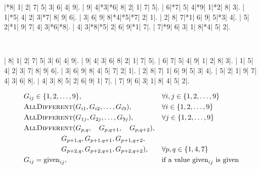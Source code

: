 \documentclass{cons-beamer}
\begin{document}
\begin{frame}[fragile]
  \begin{center}
    \vspace{2mm}
    \PuzzleUnitlength=11pt
    \renewcommand*\SudokuLinethickness{1pt}
    \renewcommand*\PuzzleFont{\sf\tiny}
    \begin{Sudoku}
      |*8| 1| 2| 7| 5| 3| 6| 4| 9|.
      | 9| 4|*3|*6| 8| 2| 1| 7| 5|.
      | 6|*7| 5| 4|*9| 1|*2| 8| 3|.
      | 1|*5| 4| 2| 3|*7| 8| 9| 6|.
      | 3| 6| 9| 8|*4|*5|*7| 2| 1|.
      | 2| 8| 7|*1| 6| 9| 5|*3| 4|.
      | 5| 2|*1| 9| 7| 4| 3|*6|*8|.
      | 4| 3|*8|*5| 2| 6| 9|*1| 7|.
      | 7|*9| 6| 3| 1| 8|*4| 5| 2|.
    \end{Sudoku}
    ~~~~~
    \PuzzleSolution
    \begin{Sudoku}
      | 8| 1| 2| 7| 5| 3| 6| 4| 9|.
      | 9| 4| 3| 6| 8| 2| 1| 7| 5|.
      | 6| 7| 5| 4| 9| 1| 2| 8| 3|.
      | 1| 5| 4| 2| 3| 7| 8| 9| 6|.
      | 3| 6| 9| 8| 4| 5| 7| 2| 1|.
      | 2| 8| 7| 1| 6| 9| 5| 3| 4|.
      | 5| 2| 1| 9| 7| 4| 3| 6| 8|.
      | 4| 3| 8| 5| 2| 6| 9| 1| 7|.
      | 7| 9| 6| 3| 1| 8| 4| 5| 2|.
    \end{Sudoku}
  \end{center}
  \begin{example}
    \footnotesize
    \vspace{-1em}
    \begin{align}
      &G_{ij} \in \{1, 2, \dots, 9\}, \quad &&\forall i, j \in \{1, 2, \dots, 9\} \\ %
      &\cons{AllDifferent}{G_{i1}, G_{i2}, \dots, G_{i9}}, \quad &&\forall i \in \{1, 2, \dots, 9\} \\ %
      &\cons{AllDifferent}{G_{1j}, G_{2j}, \dots, G_{9j}}, \quad &&\forall j \in \{1, 2, \dots, 9\} \\ 
      &\cons{AllDifferent}{G_{p, q}, ~~~G_{p, q+1}, ~~~G_{p, q+2}}, && \notag \\
      &\qquad \quad \quad \quad ~G_{p+1, q}, G_{p+1, q+1}, G_{p+1, q+2}, && \notag \\
      &\qquad \quad \quad \quad ~G_{p+2, q}, G_{p+2, q+1}, G_{p+2, q+2}), \quad &&\forall p, q \in \{1, 4, 7\} \\ 
      &G_{ij} = \mbox{given}_{ij}, \quad &&\text{if a value } \mbox{given}_{ij} \text{ is given} 
    \end{align}
  \end{example}
\end{frame}
\end{document}
